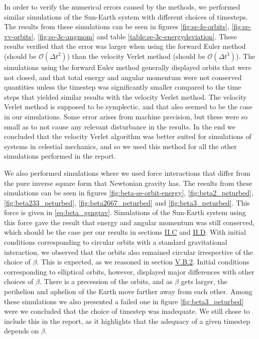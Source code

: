 \documentclass[reprint,english,notitlepage]{revtex4-1}  %
\begin{document}
In order to verify the numerical errors caused by the methods, we performed similar simulations of the Sun-Earth system with different choices of timesteps. The results from these simulations can be seen in figures \ref{fig:se-fe-orbits}, \ref{fig:se-vv-orbits}, \ref{fig:se-3c-angmom} and table \ref{table:se-3c-energydeviation}. These results verified that the error was larger when using the forward Euler method (should be $\mathcal{O}(\Delta t^2)$) than the velocity Verlet method (should be $\mathcal{O}(\Delta t^3)$). The simulations using the forward Euler method generally displayed orbits that were not closed, and that total energy and angular momentum were not conserved quantities unless the timestep was significantly smaller compared to the time steps that yielded similar results with the velocity Verlet method. The velocity Verlet method is supposed to be symplectic, and that also seemed to be the case in our simulations. Some error arises from machine precision, but these were so small as to not cause any relevant disturbance in the results. In the end we concluded that the velocity Verlet algorithm was better suited for simulations of systems in celestial mechanics, and so we used this method for all the other simulations performed in the report.

We also performed simulations where we used force interactions that differ from the pure inverse square form that Newtonian gravity has. The results from these simulations can be seen in figures \ref{fig:beta-se-orbit-energy}, \ref{fig:beta2_peturbed}, \ref{fig:beta233_peturbed}, \ref{fig:beta2667_peturbed} and \ref{fig:beta3_peturbed}. This force is given in \eqref{eq:beta_gengrav}. Simulations of the Sun-Earth system using this force gave the result that energy and angular momentum was still conserved, which should be the case per our results in sections  \hyperref[sec:II:c]{II.C} and \hyperref[sec:II:d]{II.D}. With initial conditions corresponding to circular orbits with a standard gravitational interaction, we observed that the orbits also remained circular irrespective of the choice of $\beta$. This is expected, as we reasoned in section \hyperref[sec:V:b:ii]{V.B.2}. Initial conditions corresponding to elliptical orbits, however, displayed major differences with other choices of $\beta$. There is a precession of the orbits, and as $\beta$ gets larger, the perihelion and aphelion of the Earth move farther away from each other. Among these simulations we also presented a failed one in figure \ref{fig:beta3_peturbed} were we concluded that the choice of timestep was inadequate. We still chose to include this in the report, as it highlights that the adequacy of a given timestep depends on $\beta$. 
\end{document}
